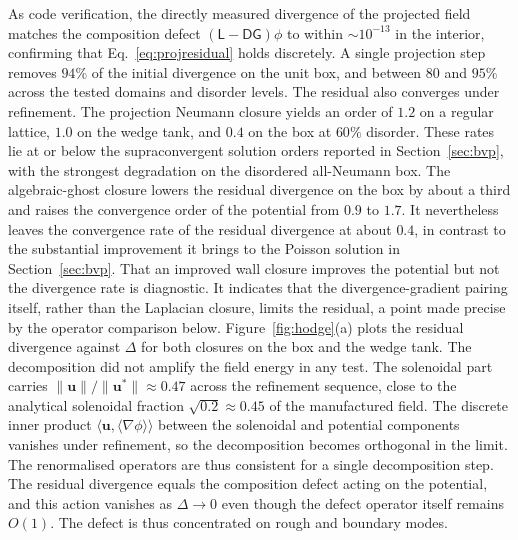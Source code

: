 \documentclass[preprint,review,12pt]{elsarticle}
\newcommand{\gradop}[1]{\langle\nabla #1\rangle}
\begin{document}
As code verification, the directly measured divergence of the projected field matches the composition defect $(\mathsf L-\mathsf D\mathsf G)\phi$ to within $\sim10^{-13}$ in the interior, confirming that Eq.~\eqref{eq:projresidual} holds discretely.
A single projection step removes $94\%$ of the initial divergence on the unit box, and between $80$ and $95\%$ across the tested domains and disorder levels.
The residual also converges under refinement.
The projection Neumann closure yields an order of $1.2$ on a regular lattice, $1.0$ on the wedge tank, and $0.4$ on the box at $60\%$ disorder.
These rates lie at or below the supraconvergent solution orders reported in Section~\ref{sec:bvp}, with the strongest degradation on the disordered all-Neumann box.
The algebraic-ghost closure lowers the residual divergence on the box by about a third and raises the convergence order of the potential from $0.9$ to $1.7$.
It nevertheless leaves the convergence rate of the residual divergence at about $0.4$, in contrast to the substantial improvement it brings to the Poisson solution in Section~\ref{sec:bvp}.
That an improved wall closure improves the potential but not the divergence rate is diagnostic.
It indicates that the divergence-gradient pairing itself, rather than the Laplacian closure, limits the residual, a point made precise by the operator comparison below.
Figure~\ref{fig:hodge}(a) plots the residual divergence against $\Delta$ for both closures on the box and the wedge tank.
The decomposition did not amplify the field energy in any test.
The solenoidal part carries $\|\mathbf u\|/\|\mathbf u^\ast\|\approx0.47$ across the refinement sequence, close to the analytical solenoidal fraction $\sqrt{0.2}\approx0.45$ of the manufactured field.
The discrete inner product $\langle\mathbf u,\gradop{\phi}\rangle$ between the solenoidal and potential components vanishes under refinement, so the decomposition becomes orthogonal in the limit.
The renormalised operators are thus consistent for a single decomposition step.
The residual divergence equals the composition defect acting on the potential, and this action vanishes as $\Delta\to0$ even though the defect operator itself remains $O(1)$.
The defect is thus concentrated on rough and boundary modes.
\end{document}
